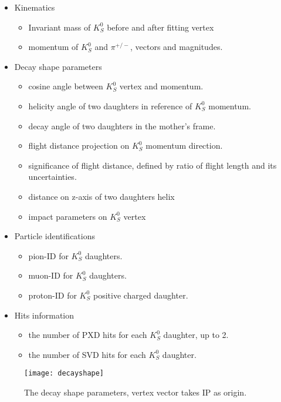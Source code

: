 \begin{itemize}
	\item Kinematics
	\begin{itemize}
		\item Invariant mass of $K_S^0$ before and after fitting vertex
		\item momentum of $K_S^0$ and $\pi^{+/-}$, vectors and magnitudes. 
	\end{itemize}
	
	\item Decay shape parameters
	\begin{itemize}
		\item cosine angle between $K_S^0$ vertex and momentum.
		\item helicity angle of two daughters in reference of $K_S^0$ momentum.
		\item decay angle of two daughters in the mother's frame. 
		\item flight distance projection on $K_S^0$ momentum direction.
		\item significance of flight distance, defined by ratio of flight length and its uncertainties.
		\item distance on z-axis of two daughters helix 
		\item impact parameters on $K_S^0$ vertex
	\end{itemize}
	
	\item Particle identifications
	\begin{itemize}
		\item pion-ID for $K_S^0$ daughters.
		\item muon-ID for $K_S^0$ daughters.
		\item proton-ID for $K_S^0$ positive charged daughter. 
	\end{itemize}

	\item Hits information
	\begin{itemize}
		\item the number of PXD hits for each $K_S^0$ daughter, up to 2.
		\item the number of SVD hits for each $K_S^0$ daughter.
	\end{itemize}
	
\end{itemize}

\begin{figure}
	\centering
	\texttt{[image: decayshape]}
	\caption{The decay shape parameters, vertex vector takes IP as origin. }
\end{figure}


